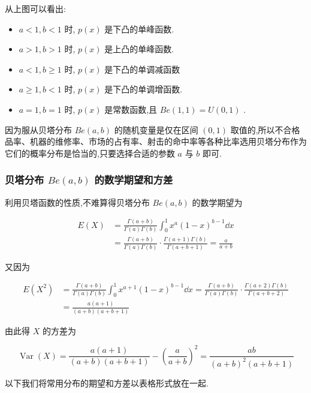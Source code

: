 从上图可以看出:
\begin{itemize}
	\item $ a<1,b<1 $ 时, $ p(x) $ 是下凸的单峰函数.
	\item $ a>1,b>1 $ 时, $ p(x) $ 是上凸的单峰函数.
	\item $ a<1,b \geqslant 1 $ 时, $ p(x) $ 是下凸的单调减函数
	\item $ a \geqslant 1, b<1 $ 时, $ p(x) $ 是下凸的单调增函数.
	\item $ a=1,b=1 $ 时, $ p(x) $ 是常数函数,且 $ Be(1,1)=U(0,1) $ .
\end{itemize}

因为服从贝塔分布 $ Be(a,b) $ 的随机变量是仅在区间 $ (0,1) $ 取值的,所以不合格品率、机器的维修率、市场的占有率、射击的命中率等各种比率选用贝塔分布作为它们的概率分布是恰当的,只要选择合适的参数 $ a $ 与 $ b $ 即可.

\subsubsection{贝塔分布 $ Be(a,b) $ 的数学期望和方差}

利用贝塔函数的性质,不难算得贝塔分布 $ Be(a,b) $ 的数学期望为

\[
\begin{aligned} E(X) &=\frac{\Gamma(a+b)}{\Gamma(a) \Gamma(b)} \int_{0}^{1} x^{a}(1-x)^{b-1} \dd x \\ &=\frac{\Gamma(a+b)}{\Gamma(a) \Gamma(b)} \cdot \frac{\Gamma(a+1) \Gamma(b)}{\Gamma(a+b+1)}=\frac{a}{a+b} \end{aligned}
\]

又因为

\[
\begin{aligned} E\left(X^{2}\right) &=\frac{\Gamma(a+b)}{\Gamma(a) \Gamma(b)} \int_{0}^{1} x^{a+1}(1-x)^{b-1} \dd x=\frac{\Gamma(a+b)}{\Gamma(a) \Gamma(b)} \cdot \frac{\Gamma(a+2) \Gamma(b)}{\Gamma(a+b+2)} \\ &=\frac{a(a+1)}{(a+b)(a+b+1)} \end{aligned}
\]

由此得 $ X $ 的方差为

\[
\operatorname{Var}(X)=\frac{a(a+1)}{(a+b)(a+b+1)}-\left(\frac{a}{a+b}\right)^{2}=\frac{a b}{(a+b)^{2}(a+b+1)}
\]

以下我们将常用分布的期望和方差以表格形式放在一起.

